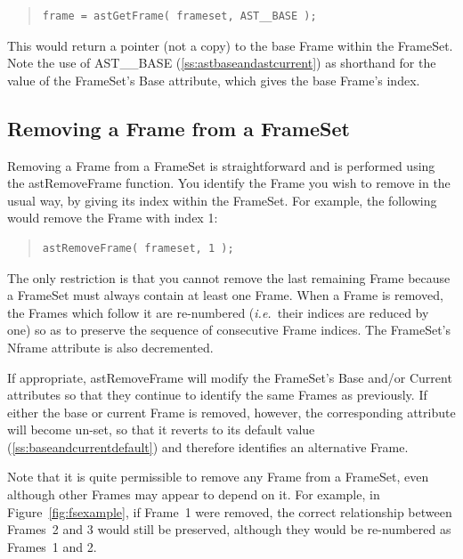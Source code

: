 \documentclass[twoside,11pt]{article}
\newcommand{\htmlref}[2]{#1}
\newcommand{\secref}[1]{\S\ref{#1}}
\renewcommand{\secref}[1]{\ref{#1}}
\begin{document}
\begin{quote}
\small
\begin{verbatim}
frame = astGetFrame( frameset, AST__BASE );
\end{verbatim}
\normalsize
\end{quote}

This would return a pointer (not a copy) to the base Frame within the
FrameSet. Note the use of AST\_\_BASE
(\secref{ss:astbaseandastcurrent}) as shorthand for the value of the
FrameSet's \htmlref{Base}{Base} attribute, which gives the base Frame's index.

\subsection{Removing a Frame from a FrameSet}

Removing a \htmlref{Frame}{Frame} from a \htmlref{FrameSet}{FrameSet} is straightforward and is performed
using the \htmlref{astRemoveFrame}{astRemoveFrame} function. You identify the Frame you wish to
remove in the usual way, by giving its index within the FrameSet. For
example, the following would remove the Frame with index 1:

\begin{quote}
\small
\begin{verbatim}
astRemoveFrame( frameset, 1 );
\end{verbatim}
\normalsize
\end{quote}

The only restriction is that you cannot remove the last remaining
Frame because a FrameSet must always contain at least one Frame.  When
a Frame is removed, the Frames which follow it are re-numbered
({\em{i.e.}}\ their indices are reduced by one) so as to preserve the
sequence of consecutive Frame indices.  The FrameSet's \htmlref{Nframe}{Nframe}
attribute is also decremented.

If appropriate, astRemoveFrame will modify the FrameSet's \htmlref{Base}{Base} and/or
\htmlref{Current}{Current} attributes so that they continue to identify the same Frames
as previously. If either the base or current Frame is removed,
however, the corresponding attribute will become un-set, so that it
reverts to its default value (\secref{ss:baseandcurrentdefault}) and
therefore identifies an alternative Frame.

Note that it is quite permissible to remove any Frame from a FrameSet,
even although other Frames may appear to depend on it. For example, in
Figure~\ref{fig:fsexample}, if Frame~1 were removed, the correct
relationship between Frames~2 and 3 would still be preserved, although
they would be re-numbered as Frames~1 and 2.
\end{document}
